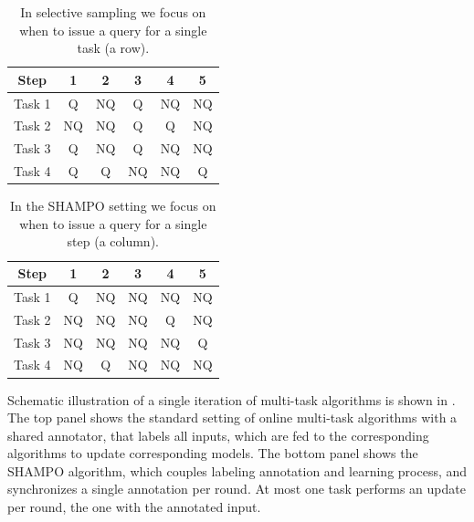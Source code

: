 \begin{table}[htdp]
\begin{center}
{
\centering
\begin{tabular}{|c c c c c c|} \hline
 Step &	1 &	2 &	3 &	4 &	5 \\  \hline
 Task 1 &	Q      &	NQ &	Q &	NQ &	NQ \\ \hline
 Task 2 &	NQ   &	NQ &	Q &	Q &	NQ \\ \hline
 Task 3 &	Q      &	 NQ &	Q &	NQ &	NQ \\ \hline
 Task 4 &	Q      &	Q &	NQ &	NQ &	Q \\ \hline
\end{tabular}
}
\end{center}
\caption{In selective sampling we focus on when to issue a query for a single task (a row).}
\label{tab:multitask_selective_sampling_example}
\end{table}

\begin{table}[htdp]
\begin{center}
{
\centering
\begin{tabular}{|c c c c c c|} \hline
 Step &	1 &	2 &	3 &	4 &	5 \\  \hline
 Task 1 &	Q &	  NQ &	NQ &	NQ &	NQ \\ \hline
 Task 2 &	NQ &	NQ &	NQ &	Q &	NQ \\ \hline
 Task 3 &	NQ &	 NQ &	NQ &	NQ &	Q \\ \hline
 Task 4 &	NQ &	Q &	NQ &	NQ &	NQ \\ \hline
\end{tabular}
}
\end{center}
\label{tab:multitask_SHAMPO_example} 
\caption{ In the SHAMPO setting we focus on when to issue a query for a single step (a column).}
\end{table}


Schematic illustration of a single iteration of multi-task algorithms is shown in . 
The top panel shows the standard setting of online multi-task algorithms with a shared annotator, that 
labels all inputs, which are fed to the corresponding algorithms to update corresponding models. The
bottom panel shows the SHAMPO algorithm, which couples labeling
annotation and learning process, and synchronizes a single annotation
per round.  At most one task performs an update per round, the one
with the annotated input.

